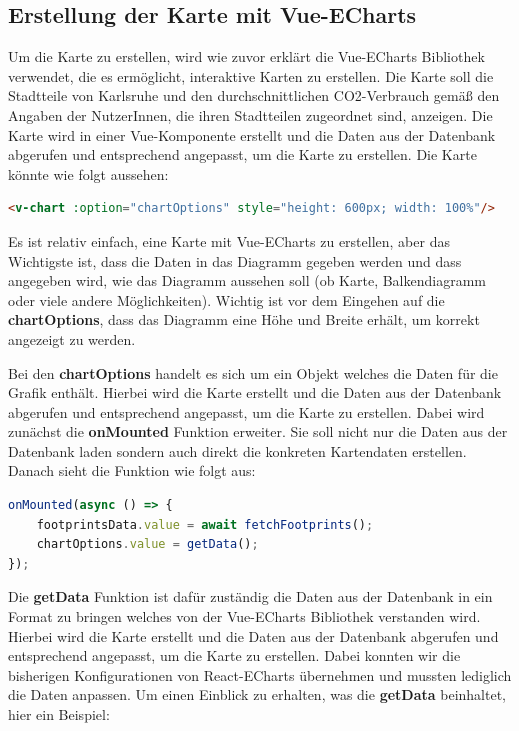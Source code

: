 \subsection{Erstellung der Karte mit Vue-ECharts}

Um die Karte zu erstellen, wird wie zuvor erklärt die Vue-ECharts Bibliothek verwendet, die es ermöglicht, interaktive Karten zu erstellen. Die Karte soll die Stadtteile von Karlsruhe und den durchschnittlichen CO2-Verbrauch gemäß den Angaben der NutzerInnen, die ihren Stadtteilen zugeordnet sind, anzeigen. Die Karte wird in einer Vue-Komponente erstellt und die Daten aus der Datenbank abgerufen und entsprechend angepasst, um die Karte zu erstellen. Die Karte könnte wie folgt aussehen:

\begin{lstlisting}[language={html}, caption={Vue-ECharts Diagramm Beispiel}]
<v-chart :option="chartOptions" style="height: 600px; width: 100%"/>
\end{lstlisting}

Es ist relativ einfach, eine Karte mit Vue-ECharts zu erstellen, aber das Wichtigste ist, dass die Daten in das Diagramm gegeben werden und dass angegeben wird, wie das Diagramm aussehen soll (ob Karte, Balkendiagramm oder viele andere Möglichkeiten). Wichtig ist vor dem Eingehen auf die \textbf{chartOptions}, dass das Diagramm eine Höhe und Breite erhält, um korrekt angezeigt zu werden.

Bei den \textbf{chartOptions} handelt es sich um ein Objekt welches die Daten für die Grafik enthält. Hierbei wird die Karte erstellt und die Daten aus der Datenbank abgerufen und entsprechend angepasst, um die Karte zu erstellen. Dabei wird zunächst die \textbf{onMounted} Funktion erweiter. Sie soll nicht nur die Daten aus der Datenbank laden sondern auch direkt die konkreten Kartendaten erstellen. Danach sieht die Funktion wie folgt aus:

\begin{lstlisting}[language={JavaScript}, caption={Laden der Fußabdrücke und erstellen der Diagramm Daten und Konfiguration}]
onMounted(async () => {
    footprintsData.value = await fetchFootprints();
    chartOptions.value = getData();
});
\end{lstlisting}

Die \textbf{getData} Funktion ist dafür zuständig die Daten aus der Datenbank in ein Format zu bringen welches von der Vue-ECharts Bibliothek verstanden wird. Hierbei wird die Karte erstellt und die Daten aus der Datenbank abgerufen und entsprechend angepasst, um die Karte zu erstellen. Dabei konnten wir die bisherigen Konfigurationen von React-ECharts übernehmen und mussten lediglich die Daten anpassen. Um einen Einblick zu erhalten, was die \textbf{getData} beinhaltet, hier ein Beispiel:

